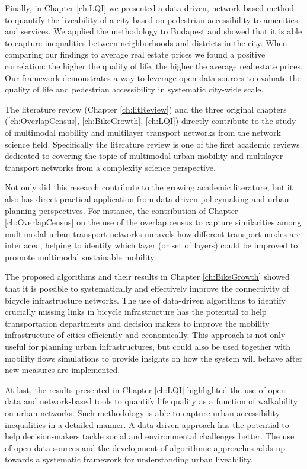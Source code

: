 Finally, in Chapter \ref{ch:LQI} we presented a data-driven, network-based method to quantify the liveability of a city based on pedestrian accessibility to amenities and services. We applied the methodology to Budapest and showed that it is able to capture inequalities between neighborhoods and districts in the city. When comparing our findings to average real estate prices we found a positive correlation: the higher the quality of life, the higher the average real estate prices. Our framework demonstrates a way to leverage open data sources to evaluate the quality of life and pedestrian accessibility in systematic city-wide scale.

The literature review (Chapter \ref{ch:litReview}) and the three original chapters (\ref{ch:OverlapCensus}, \ref{ch:BikeGrowth}, \ref{ch:LQI}) directly contribute to the study of multimodal mobility and multilayer transport networks from the network science field. Specifically the literature review is one of the first academic reviews dedicated to covering the topic of multimodal urban mobility and multilayer transport networks from a complexity science perspective.
 
Not only did this research contribute to the growing academic literature, but it also has direct practical application from data-driven policymaking and urban planning perspectives. For instance, the contribution of Chapter \ref{ch:OverlapCensus} on the use of the overlap census to capture similarities among multimodal urban transport networks unravels how different transport modes are interlaced, helping to identify which layer (or set of layers) could be improved to promote multimodal sustainable mobility.

The proposed algorithms and their results in Chapter \ref{ch:BikeGrowth} showed that it is possible to systematically and effectively improve the connectivity of bicycle infrastructure networks. The use of data-driven algorithms to identify crucially missing links in bicycle infrastructure has the potential to help transportation departments and decision makers to improve the mobility infrastructure of cities efficiently and economically. This approach is not only useful for planning urban infrastructures, but could also be used together with  mobility flows simulations to provide insights on how the system will behave after new measures are implemented.

At last, the results presented in Chapter \ref{ch:LQI} highlighted the use of open data and network-based tools to quantify life quality as a function of walkability on urban networks. Such methodology is able to capture urban accessibility inequalities in a detailed manner. A data-driven approach has the potential to help decision-makers tackle social and environmental challenges better. The use of open data sources and the development of algorithmic approaches adds up towards a systematic framework for understanding urban liveability.


